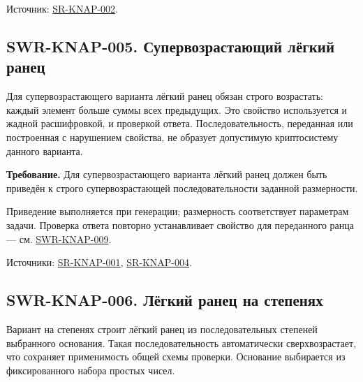 \documentclass[12pt,a4paper]{article}
\begin{document}
Источник: {\href{../04\_Системные\_требования/DOC-05\_Системные\_требования.pdf\#sr-knap-002}{SR-KNAP-002}}.

\subsection{SWR-KNAP-005. Супервозрастающий лёгкий ранец}\label{swr-knap-005-ux441ux443ux43fux435ux440ux432ux43eux437ux440ux430ux441ux442ux430ux44eux449ux438ux439-ux43bux451ux433ux43aux438ux439-ux440ux430ux43dux435ux446}

\hypertarget{swr-knap-005-супервозрастающий-лёгкий-ранец}{}

\hypertarget{swr-knap-005}{}

Для супервозрастающего варианта лёгкий ранец обязан строго возрастать: каждый элемент больше суммы всех предыдущих. Это свойство используется и жадной расшифровкой, и проверкой ответа. Последовательность, переданная или построенная с нарушением свойства, не образует допустимую криптосистему данного варианта.

\textbf{Требование.} Для супервозрастающего варианта лёгкий ранец должен быть приведён к строго супервозрастающей последовательности заданной размерности.

Приведение выполняется при генерации; размерность соответствует параметрам задачи. Проверка ответа повторно устанавливает свойство для переданного ранца --- см. {\hyperlink{swr-knap-009}{SWR-KNAP-009}}.

Источники: {\href{../04\_Системные\_требования/DOC-05\_Системные\_требования.pdf\#sr-knap-001}{SR-KNAP-001}}, {\href{../04\_Системные\_требования/DOC-05\_Системные\_требования.pdf\#sr-knap-004}{SR-KNAP-004}}.

\subsection{SWR-KNAP-006. Лёгкий ранец на степенях}\label{swr-knap-006-ux43bux451ux433ux43aux438ux439-ux440ux430ux43dux435ux446-ux43dux430-ux441ux442ux435ux43fux435ux43dux44fux445}

\hypertarget{swr-knap-006-лёгкий-ранец-на-степенях}{}

\hypertarget{swr-knap-006}{}

Вариант на степенях строит лёгкий ранец из последовательных степеней выбранного основания. Такая последовательность автоматически сверхвозрастает, что сохраняет применимость общей схемы проверки. Основание выбирается из фиксированного набора простых чисел.
\end{document}
